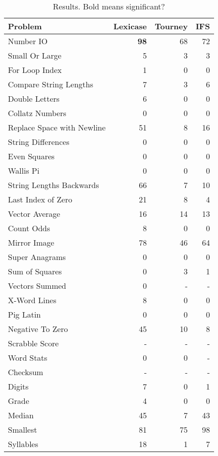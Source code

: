 \documentclass{sig-alternate}
\begin{document}
\begin{table}[h]
\centering
\caption{Results. Bold means significant?}
\label{tableResults}
\begin{tabular}{|l|rrr|}
\hline
Problem                    & Lexicase & Tourney & IFS \\
\hline
Number IO                  & \textbf{98}       & 68      & 72  \\
Small Or Large             & 5        & 3       & 3   \\
For Loop Index             & 1        & 0       & 0   \\
Compare String Lengths     & 7        & 3       & 6   \\
Double Letters             & 6        & 0       & 0   \\
Collatz Numbers            & 0        & 0       & 0   \\
Replace Space with Newline & 51       & 8       & 16  \\
String Differences         & 0        & 0       & 0   \\
Even Squares               & 0        & 0       & 0   \\
Wallis Pi                  & 0        & 0       & 0   \\
String Lengths Backwards   & 66       & 7       & 10  \\
Last Index of Zero         & 21       & 8       & 4   \\
Vector Average             & 16       & 14      & 13  \\
Count Odds                 & 8        & 0       & 0   \\
Mirror Image               & 78       & 46      & 64  \\
Super Anagrams             & 0        & 0       & 0   \\
Sum of Squares             & 0        & 3       & 1   \\
Vectors Summed             & 0        & -       & -   \\
X-Word Lines               & 8        & 0       & 0   \\
Pig Latin                  & 0        & 0       & 0   \\
Negative To Zero           & 45       & 10      & 8   \\
Scrabble Score             & -        & -       & -   \\
Word Stats                 & 0        & 0       & -   \\
Checksum                   & -        & -       & -   \\
Digits                     & 7        & 0       & 1   \\
Grade                      & 4        & 0       & 0   \\
Median                     & 45       & 7       & 43  \\
Smallest                   & 81       & 75      & 98  \\
Syllables                  & 18       & 1       & 7   \\
\hline
\end{tabular}
\end{table}
\end{document}
